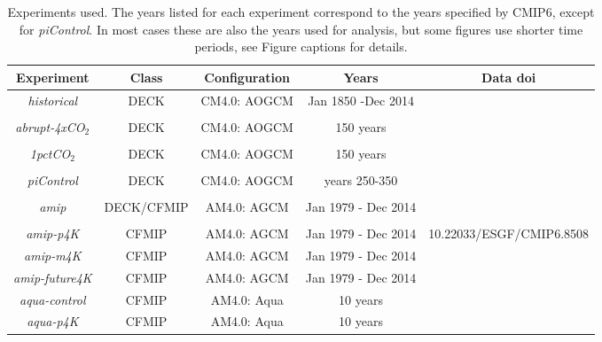 \documentclass[draft]{agujournal2019}
\begin{document}
 \begin{table}
\begin{center}
\caption{Experiments used.   The years listed for each experiment correspond to the years specified by 
CMIP6, except for \textit{piControl}.  In most cases these are also the years used for analysis, but some 
figures use shorter time periods, see Figure captions for details.  }
    \begin{tabular}{*{5}{c}}
    \hline
    \hline
 Experiment & Class & Configuration & Years  &   Data doi  \\ \hline
    \textit{historical}        &   DECK      &  CM4.0: AOGCM   &  Jan 1850 -Dec 2014               \\ 
    \\
    \textit{abrupt-4xCO$_2$}   & DECK       &  CM4.0: AOGCM       & 150 years  \\  
    \\
    \textit{1pctCO$_2$}   & DECK        &  CM4.0: AOGCM  & 150 years \\  
    \\
    \textit{piControl}  & DECK   &  CM4.0: AOGCM  &   years 250-350  \\  
    \\
    \textit{amip}  & DECK/CFMIP   &  AM4.0: AGCM   & Jan 1979 - Dec 2014  \\  
    \\
    \textit{amip-p4K}  & CFMIP       &  AM4.0: AGCM   & Jan 1979 - Dec 2014  & 10.22033/ESGF/CMIP6.8508  \\ 
    \textit{amip-m4K}   & CFMIP       &  AM4.0: AGCM   & Jan 1979 - Dec 2014 \\ 
    \textit{amip-future4K}  & CFMIP  & AM4.0: AGCM & Jan 1979 - Dec 2014 \\
    \textit{aqua-control}        & CFMIP  & AM4.0: Aqua  & 10 years \\
    \textit{aqua-p4K}  & CFMIP    & AM4.0: Aqua &  10 years \\ \hline

    \end{tabular}\par
    \label{tab:exps}
\end{center}
\end{table}
\end{document}
